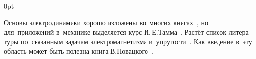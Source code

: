 \begin{changemargin}{\parindent}{0pt}
\fontsize{10}{12}\selectfont

\begin{otherlanguage}{russian}

Основы электродинамики хорошо изложены во~многих книгах~\cite{classicalelectrodynamics, feynman-lecturesonphysics}, но для~приложений в~механике выделяется курс И.\,Е.\;Тамма~\cite{tamm-electricity}. Растёт список литературы по~связанным задачам электромагнетизма и~упругости~\cite{parton-electromagneticelasticity, podstrigach.burak.kondrat-magnetothermoelasticity}. Как введение в~эту область может быть полезна книга В.\;Новацкого~\cite{nowacki-electromagneticeffects}.

\end{otherlanguage}

\end{changemargin}
